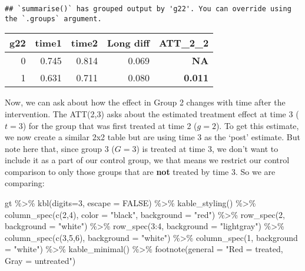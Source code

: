 \documentclass[
]{article}
\newenvironment{Shaded}{\begin{snugshade}}{\end{snugshade}}
\newcommand{\AttributeTok}[1]{\textcolor[rgb]{0.77,0.63,0.00}{#1}}
\newcommand{\ConstantTok}[1]{\textcolor[rgb]{0.00,0.00,0.00}{#1}}
\newcommand{\DecValTok}[1]{\textcolor[rgb]{0.00,0.00,0.81}{#1}}
\newcommand{\FunctionTok}[1]{\textcolor[rgb]{0.00,0.00,0.00}{#1}}
\newcommand{\NormalTok}[1]{#1}
\newcommand{\SpecialCharTok}[1]{\textcolor[rgb]{0.00,0.00,0.00}{#1}}
\newcommand{\StringTok}[1]{\textcolor[rgb]{0.31,0.60,0.02}{#1}}
\begin{document}
\begin{verbatim}
## `summarise()` has grouped output by 'g22'. You can override using the `.groups` argument.
\end{verbatim}

\begin{table}
\centering
\begin{tabular}{r|r|r|r|>{}r}
\hline
g22 & time1 & time2 & Long diff & ATT\_2\_2\\
\hline
0 & 0.745 & 0.814 & 0.069 & \textbf{NA}\\
\hline
1 & 0.631 & 0.711 & 0.080 & \textbf{0.011}\\
\hline
\end{tabular}
\end{table}

Now, we can ask about how the effect in Group 2 changes with time after
the intervention. The ATT(2,3) asks about the estimated treatment effect
at time 3 (\(t=3\)) for the group that was first treated at time 2
(\(g=2\)). To get this estimate, we now create a similar 2x2 table but
are using time 3 as the `post' estimate. But note here that, since group
3 (\(G=3\)) is treated at time 3, we don't want to include it as a part
of our control group, we that means we restrict our control comparison
to only those groups that are \textbf{not} treated by time 3. So we are
comparing:

\begin{Shaded}
\begin{Highlighting}[]
\NormalTok{gt }\SpecialCharTok{\%\textgreater{}\%}
  \FunctionTok{kbl}\NormalTok{(}\AttributeTok{digits=}\DecValTok{3}\NormalTok{, }\AttributeTok{escape =} \ConstantTok{FALSE}\NormalTok{) }\SpecialCharTok{\%\textgreater{}\%}
  \FunctionTok{kable\_styling}\NormalTok{() }\SpecialCharTok{\%\textgreater{}\%}
  \FunctionTok{column\_spec}\NormalTok{(}\FunctionTok{c}\NormalTok{(}\DecValTok{2}\NormalTok{,}\DecValTok{4}\NormalTok{), }\AttributeTok{color =} \StringTok{"black"}\NormalTok{, }\AttributeTok{background =} \StringTok{"red"}\NormalTok{) }\SpecialCharTok{\%\textgreater{}\%}
  \FunctionTok{row\_spec}\NormalTok{(}\DecValTok{2}\NormalTok{, }\AttributeTok{background =} \StringTok{"white"}\NormalTok{) }\SpecialCharTok{\%\textgreater{}\%}
  \FunctionTok{row\_spec}\NormalTok{(}\DecValTok{3}\SpecialCharTok{:}\DecValTok{4}\NormalTok{, }\AttributeTok{background  =} \StringTok{"lightgray"}\NormalTok{) }\SpecialCharTok{\%\textgreater{}\%}
  \FunctionTok{column\_spec}\NormalTok{(}\FunctionTok{c}\NormalTok{(}\DecValTok{3}\NormalTok{,}\DecValTok{5}\NormalTok{,}\DecValTok{6}\NormalTok{), }\AttributeTok{background =} \StringTok{"white"}\NormalTok{) }\SpecialCharTok{\%\textgreater{}\%}
  \FunctionTok{column\_spec}\NormalTok{(}\DecValTok{1}\NormalTok{, }\AttributeTok{background =} \StringTok{"white"}\NormalTok{) }\SpecialCharTok{\%\textgreater{}\%}
  \FunctionTok{kable\_minimal}\NormalTok{() }\SpecialCharTok{\%\textgreater{}\%}
  \FunctionTok{footnote}\NormalTok{(}\AttributeTok{general =} \StringTok{"Red = treated, Gray = untreated"}\NormalTok{)}
\end{Highlighting}
\end{Shaded}
\end{document}
